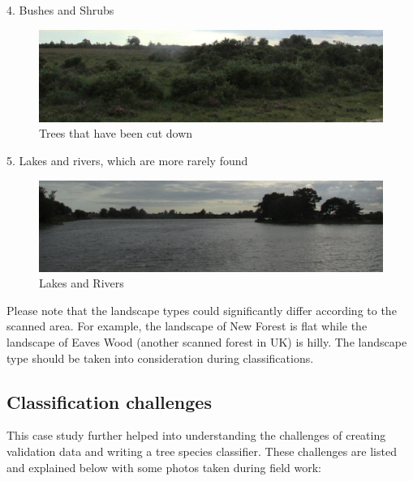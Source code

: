 \documentclass{subfiles}
\begin{document}
          \newpage
    
    4.	Bushes and Shrubs
          \begin{figure} [!h]
          	\centering
          	\includegraphics[width=\textwidth]{img/NewForest/LT_BushesAndShrubs}
          	\caption{Trees that have been cut down}
          	\label{fig:LT_BushesAndShrubs}
          \end{figure}

    
    5.	Lakes and rivers, which are more rarely found
          \begin{figure} [!h]
          	\centering
          	\includegraphics[width=\textwidth]{img/NewForest/LT_LakesAndRivers}
          	\caption{Lakes and Rivers}
          	\label{fig:LT_LakesAndRivers}
          \end{figure}

    
    

    \par Please note that the landscape types could significantly differ according to the scanned area. For example, the landscape of New Forest is flat while the landscape of Eaves Wood (another scanned forest in UK) is hilly. The landscape type should be taken into consideration during classifications. 
    
    \subsection{Classification challenges}
    \par This case study further helped into understanding the challenges of creating validation data and writing a tree species classifier. These challenges are listed and explained below with some photos taken during field work:
    
\end{document}
